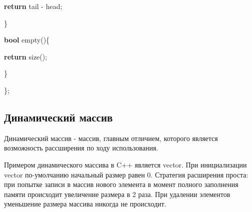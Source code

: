\begin{algorithm}
\begin{algorithmic}
		\State \hspace{2cm} \textbf{return} tail - head;

		\State \}

		\vspace{0.5cm}
		\State \hspace{1cm} \textbf{bool} empty()\{

		\State \hspace{2cm} \textbf{return} size();

		\State \hspace{1cm} \}

		\State \};

	\end{algorithmic}
\end{algorithm}


\subsection{Динамический массив}
\begin{definicion}
	Динамический массив - массив, главным отличием, которого является возможность рассширения по ходу использования.

	Примером динамического массива в C++ является vector. При инициализации vector по-умолчанию начальный размер равен 0. Стратегия расширения проста: при попытке записи в массив нового элемента в момент полного заполнения памяти происходит увеличение размера в 2 раза. При удалении элементов уменьшение размера массива никогда не происходит.

\end{definicion}